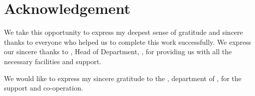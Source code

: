 \chapter*{Acknowledgement}%
%



\par We take this opportunity to express my deepest sense of gratitude and sincere thanks to everyone who helped us to complete this work successfully. We express our sincere thanks to \hod, Head of Department, \dept, \college\hspace*{2pt} for providing  us with all the necessary facilities and support.\par

We would like to express my sincere gratitude to the \projcordinatorA, \hspace*{2pt} department of \hspace*{2pt} \dept, \hspace*{2pt} \college\hspace*{2pt} for the support and co-operation.


\vspace*{30pt}
\begin{flushright}
	\textbf{\studentA}\\
	\textbf{\studentB}\\
	\textbf{\studentC}\\
	\textbf{\studentD}\\
\end{flushright}
\thispagestyle{plain}
